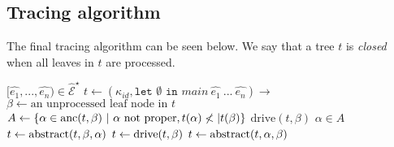 \documentclass[10pt]{../sigplanconf}
\newcommand{\anc}{\ensuremath{{\rm anc}}}
\newcommand{\gen}{\ensuremath{~{\leq\kern-6pt \raisebox{1pt}{$\cdot$}}~}}
\begin{document}
\subsection{Tracing algorithm}
The final tracing algorithm can be seen below. We say that a tree $t$
is \emph{closed} when all leaves in $t$ are processed.
\begin{algorithmic}
   $[\widehat{e_1}, ..., \widehat{e_n}) \in \widehat{\mathcal{E}}^\star$
  \STATE $t\gets (\kappa_{id}, \texttt{let $\emptyset$ in $main~\widehat{e_1}~...~\widehat{e_n}$})\rightarrow$
    \STATE $\beta\gets\text{an unprocessed leaf node in $t$}$
    \STATE $A\gets\{ \alpha\in\anc(t,\beta) ~|~ \alpha\text{ not proper}, t(\alpha) \not<| t(\beta)  \}$
      \STATE $\textrm{drive}(t,\beta)$
    \ELSE
      $\alpha \in A$
      \IF{$t_\mathcal{L}(\alpha) \gen t_\mathcal{L}(\beta)$}
       \STATE $t\gets {\rm abstract}(t,\beta,\alpha)$
        \STATE $t\gets {\rm drive}(t,\beta)$
      \ELSE
        \STATE $t\gets {\rm abstract}(t,\alpha,\beta)$
      \ENDIF
    \ENDIF
  \ENDWHILE
\end{algorithmic}



\end{document}
